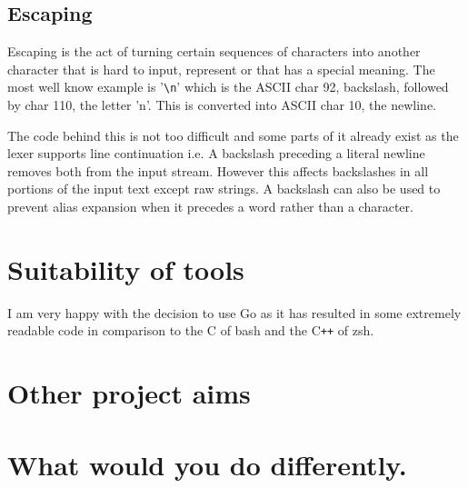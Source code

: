 \subsection{Escaping}
Escaping is the act of turning certain sequences of characters into another character that is hard to input, represent or that has a special meaning.
The most well know example is '\verb!\n!' which is the ASCII char 92, backslash, followed by char 110, the letter 'n'.
This is converted into ASCII char 10, the newline.

The code behind this is not too difficult and some parts of it already exist as the lexer supports line continuation i.e. A backslash preceding a literal newline removes both from the input stream.
However this affects backslashes in all portions of the input text except raw strings.
A backslash can also be used to prevent alias expansion when it precedes a word rather than a character.



\section{Suitability of tools}
I am very happy with the decision to use Go as it has resulted in some extremely readable code in comparison to the C of bash and the C\verb!++! of zsh.




\section{Other project aims}

\section{What would you do differently.}













